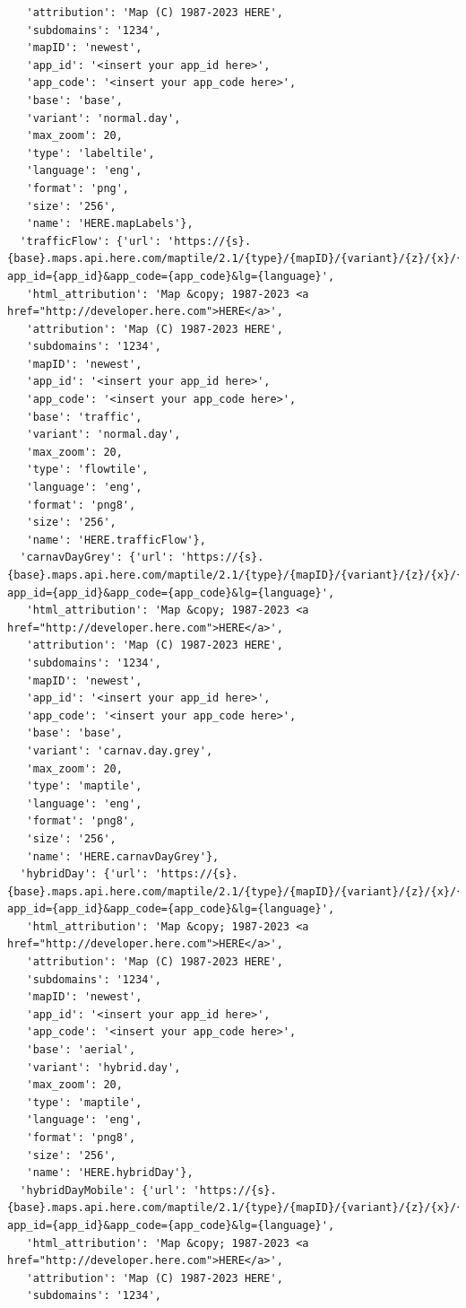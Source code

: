 \documentclass[
  letterpaper,
  DIV=11,
  numbers=noendperiod]{scrreprt}
\begin{document}
\begin{verbatim}
   'attribution': 'Map (C) 1987-2023 HERE',
   'subdomains': '1234',
   'mapID': 'newest',
   'app_id': '<insert your app_id here>',
   'app_code': '<insert your app_code here>',
   'base': 'base',
   'variant': 'normal.day',
   'max_zoom': 20,
   'type': 'labeltile',
   'language': 'eng',
   'format': 'png',
   'size': '256',
   'name': 'HERE.mapLabels'},
  'trafficFlow': {'url': 'https://{s}.{base}.maps.api.here.com/maptile/2.1/{type}/{mapID}/{variant}/{z}/{x}/{y}/{size}/{format}?app_id={app_id}&app_code={app_code}&lg={language}',
   'html_attribution': 'Map &copy; 1987-2023 <a href="http://developer.here.com">HERE</a>',
   'attribution': 'Map (C) 1987-2023 HERE',
   'subdomains': '1234',
   'mapID': 'newest',
   'app_id': '<insert your app_id here>',
   'app_code': '<insert your app_code here>',
   'base': 'traffic',
   'variant': 'normal.day',
   'max_zoom': 20,
   'type': 'flowtile',
   'language': 'eng',
   'format': 'png8',
   'size': '256',
   'name': 'HERE.trafficFlow'},
  'carnavDayGrey': {'url': 'https://{s}.{base}.maps.api.here.com/maptile/2.1/{type}/{mapID}/{variant}/{z}/{x}/{y}/{size}/{format}?app_id={app_id}&app_code={app_code}&lg={language}',
   'html_attribution': 'Map &copy; 1987-2023 <a href="http://developer.here.com">HERE</a>',
   'attribution': 'Map (C) 1987-2023 HERE',
   'subdomains': '1234',
   'mapID': 'newest',
   'app_id': '<insert your app_id here>',
   'app_code': '<insert your app_code here>',
   'base': 'base',
   'variant': 'carnav.day.grey',
   'max_zoom': 20,
   'type': 'maptile',
   'language': 'eng',
   'format': 'png8',
   'size': '256',
   'name': 'HERE.carnavDayGrey'},
  'hybridDay': {'url': 'https://{s}.{base}.maps.api.here.com/maptile/2.1/{type}/{mapID}/{variant}/{z}/{x}/{y}/{size}/{format}?app_id={app_id}&app_code={app_code}&lg={language}',
   'html_attribution': 'Map &copy; 1987-2023 <a href="http://developer.here.com">HERE</a>',
   'attribution': 'Map (C) 1987-2023 HERE',
   'subdomains': '1234',
   'mapID': 'newest',
   'app_id': '<insert your app_id here>',
   'app_code': '<insert your app_code here>',
   'base': 'aerial',
   'variant': 'hybrid.day',
   'max_zoom': 20,
   'type': 'maptile',
   'language': 'eng',
   'format': 'png8',
   'size': '256',
   'name': 'HERE.hybridDay'},
  'hybridDayMobile': {'url': 'https://{s}.{base}.maps.api.here.com/maptile/2.1/{type}/{mapID}/{variant}/{z}/{x}/{y}/{size}/{format}?app_id={app_id}&app_code={app_code}&lg={language}',
   'html_attribution': 'Map &copy; 1987-2023 <a href="http://developer.here.com">HERE</a>',
   'attribution': 'Map (C) 1987-2023 HERE',
   'subdomains': '1234',

\end{verbatim}
\end{document}
